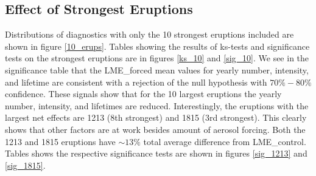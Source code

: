 \subsection{Effect of Strongest Eruptions}
Distributions of diagnostics with only the 10 strongest eruptions included are shown in figure \ref{10_erups}. Tables showing the results of ks-tests and significance tests on the strongest eruptions are in figures \ref{ks_10} and \ref{sig_10}. We see in the significance table that the LME_{forced} mean values for yearly number, intensity, and lifetime are consistent with a rejection of the null hypothesis with $70\%-80\%$ confidence. These signals show that for the 10 largest eruptions the yearly number, intensity, and lifetimes are reduced. Interestingly, the eruptions with the largest net effects are 1213 (8th strongest) and 1815 (3rd strongest). This clearly shows that other factors are at work besides amount of aerosol forcing. Both the 1213 and 1815 eruptions have $\sim13\%$ total average difference from LME_{control}. Tables shows the respective significance tests are shown in figures \ref{sig_1213} and \ref{sig_1815}.   

